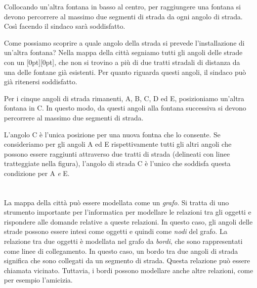 {{{\centering%
\par}

Collocando un’altra fontana in basso al centro, per raggiungere una fontana si devono percorrere al massimo due segmenti di strada da ogni angolo di strada.
Così facendo il sindaco sarà soddisfatto.

Come possiamo scoprire a quale angolo della strada si prevede l’installazione di un’altra fontana?
Nella mappa della città segniamo tutti gli angoli delle strade con un \raisebox{-0.5ex}[0pt][0pt]{},
che non si trovino a più di due tratti stradali di distanza da una delle fontane già esistenti.
Per quanto riguarda questi angoli, il sindaco può già ritenersi soddisfatto.

{\centering%
\par}

Per i cinque angoli di strada rimanenti, A, B, C, D ed E, posizioniamo un’altra fontana in C. In questo modo, da questi angoli alla fontana successiva si devono percorrere al massimo due segmenti di strada.

L’angolo C è l’unica posizione per una nuova fontna che lo consente.
Se consideriamo per gli angoli A ed E rispettivamente tutti gli altri angoli che possono essere raggiunti attraverso due tratti di strada (delineati con linee tratteggiate nella figura),
l’angolo di strada C è l’unico che soddisfa questa condizione per A \emph{e} E.



\section*{\BrochureItsInformatics}
La mappa della città può essere modellata come un \emph{grafo}.
Si tratta di uno strumento importante per l’informatica per modellare le relazioni tra gli oggetti e rispondere alle domande relative a queste relazioni.
In questo caso, gli angoli delle strade possono essere intesi come oggetti e quindi come \emph{nodi} del grafo.
La relazione tra due oggetti è modellata nel grafo da \emph{bordi}, che sono rappresentati come linee di collegamento. In questo caso, un bordo tra due angoli di strada significa che sono collegati da un segmento di strada. Questa relazione può essere chiamata vicinato. Tuttavia, i bordi possono modellare anche altre relazioni, come per esempio l’amicizia.

}}
